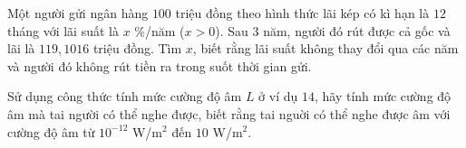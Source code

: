 \begin{bt}%

	Một người gửi ngân hàng $100$ triệu đồng theo hình thức lãi kép có kì hạn là $12$ tháng với lãi suất là $x$ $\%$/năm ($x>0$). Sau $3$ năm, người đó rút được cả gốc và lãi là $119{,}1016$ triệu đồng. Tìm $x$, biết rằng lãi suất không thay đổi qua các năm và người đó không rút tiền ra trong suốt thời gian gửi.
\end{bt}

\begin{bt}%

	Sử dụng công thức tính mức cường độ âm $L$ ở ví dụ $14$, hãy tính mức cường độ âm mà tai người có thể nghe được, biết rằng tai nguời có thể nghe được âm với cường độ âm từ $10^{-12}$ W/m$^2$ đến $10$ W/m$^2$.
\end{bt}

